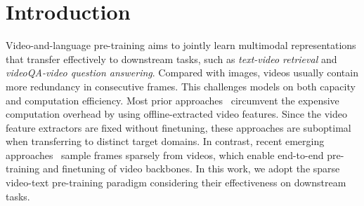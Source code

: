 \documentclass[10pt,twocolumn,letterpaper]{article}
\begin{document}
\section{Introduction}
\label{sec:intro}
Video-and-language pre-training aims to jointly learn multimodal representations that transfer effectively to downstream tasks, such as {\em text-video retrieval} and {\em videoQA-video question answering}.
Compared with images, videos usually contain more redundancy in consecutive frames. This challenges models on both capacity and computation efficiency.
Most prior approaches~\cite{li2020hero,miech2019howto100m,zhu2020actbert,miech2020end,sun2019videobert,luo2020univl} circumvent the expensive computation overhead by using offline-extracted video features. Since the video feature extractors are fixed without finetuning, these approaches are suboptimal when transferring to distinct target domains.
In contrast, recent emerging approaches~\cite{lei2021less,Bain21} sample frames sparsely from videos,
which enable end-to-end pre-training and finetuning of video backbones.
In this work, we adopt the sparse video-text pre-training paradigm considering their effectiveness on downstream tasks.
\end{document}
